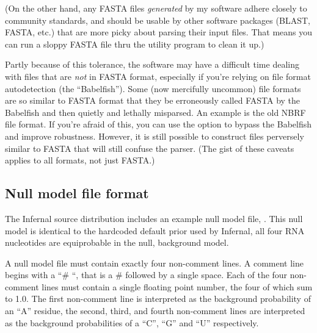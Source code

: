 (On the other hand, any FASTA files \emph{generated} by my software
adhere closely to community standards, and should be usable by other
software packages (BLAST, FASTA, etc.) that are more picky about
parsing their input files. That means you can run a sloppy FASTA file
thru the  utility program to clean it up.)

Partly because of this tolerance, the software may have a difficult
time dealing with files that are \textit{not} in FASTA format,
especially if you're relying on file format autodetection (the
``Babelfish'').  Some (now mercifully uncommon) file formats are so
similar to FASTA format that they be erroneously called FASTA by the
Babelfish and then quietly and lethally misparsed. An example is the
old NBRF file format. If you're afraid of this, you can use the
 option to bypass the Babelfish and improve
robustness. However, it is still possible to construct files
perversely similar to FASTA that will still confuse the parser.  (The
gist of these caveats applies to all formats, not just FASTA.)

\subsection{Null model file format}

The Infernal source distribution includes an example null model file, 
. This null model is identical to the hardcoded default
prior used by Infernal, all four RNA nucleotides are equiprobable in
the null, background model. 

A null model file must contain exactly four non-comment lines. A
comment line begins with a ``\# ``, that is a \# followed by a single
space. Each of the four non-comment lines must contain a single floating point
number, the four of which sum to 1.0. The first non-comment line is interpreted as
the background probability of an ``A'' residue, the second, third, and
fourth non-comment lines are interpreted as the background
probabilities of a ``C'', ``G'' and ``U'' respectively. 




